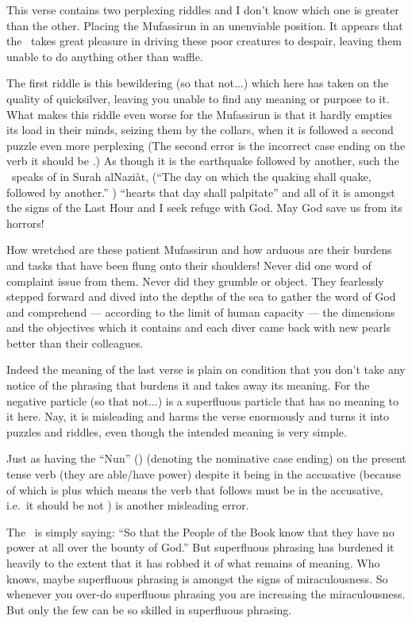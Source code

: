 \documentclass[12pt]{memoir}
\begin{document}
This verse contains two perplexing riddles and I don’t know
which one is greater than the other.
Placing the Mufassirun in an unenviable position.
It appears that the \Quran\ takes great pleasure in driving
these poor creatures to despair,
leaving them unable to do anything other than waffle.

The first riddle is this bewildering  (so that not...)
which here has taken on the quality of quicksilver,
leaving you unable to find any meaning or purpose to it.
What makes this riddle even worse for the Mufassirun is
that it hardly empties its load in their minds, seizing them by the collars,
when it is followed a second puzzle even more perplexing
(The second error is the incorrect case ending
on the verb  it should be .)
As though it is the earthquake followed by another,
such the \Quran\ speaks of in Surah al\–Nazi\`at,
(“The day on which the quaking shall quake, followed by another.”
)
“hearts that day shall palpitate”
and all of it is amongst the signs of the Last Hour
and I seek refuge with God.
May God save us from its horrors!

How wretched are these patient Mufassirun and how arduous are their burdens
and tasks that have been flung onto their shoulders!
Never did one word of complaint issue from them.
Never did they grumble or object.
They fearlessly stepped forward and dived into the depths of the sea
to gather the word of God and comprehend —
according to the limit of human capacity —
the dimensions and the objectives which it contains
and each diver came back with new pearls better than their colleagues.

Indeed the meaning of the last verse is plain on condition
that you don’t take any notice of the phrasing that burdens it
and takes away its meaning.
For the negative particle  (so that not...) is a superfluous particle
that has no meaning to it here.
Nay, it is misleading and harms the verse enormously
and turns it into puzzles and riddles,
even though the intended meaning is very simple.

Just as having the “Nun” () (denoting the nominative case ending)
on the present tense verb  (they are able/have power)
despite it being in the accusative
(because of  which is  plus 
which means the verb that follows must be in the accusative,
i.e.\ it should be  not ) is another misleading error.

The \Quran\ is simply saying:
“So that the People of the Book know
that they have no power at all over the bounty of God.”
But superfluous phrasing has burdened it heavily to the extent
that it has robbed it of what remains of meaning.
Who knows, maybe superfluous phrasing is amongst the signs of miraculousness.
So whenever you over-do superfluous phrasing
you are increasing the miraculousness.
But only the few can be so skilled in superfluous phrasing.
\end{document}
